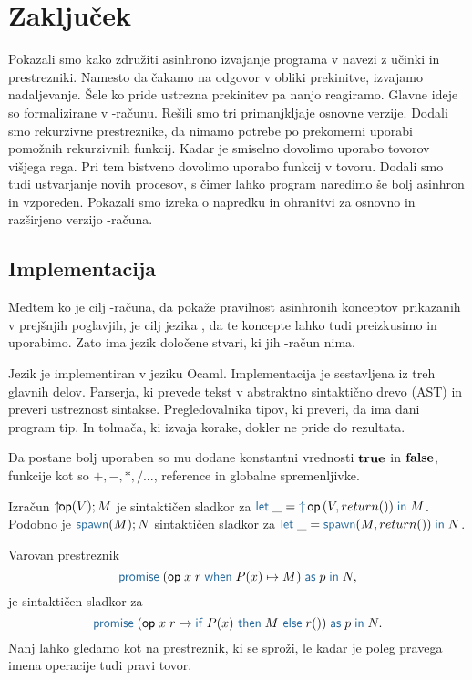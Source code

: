 \section{Zaključek}

Pokazali smo kako združiti asinhrono izvajanje programa v navezi z učinki in prestrezniki. Namesto da čakamo na odgovor v obliki prekinitve, izvajamo nadaljevanje. Šele ko pride ustrezna prekinitev pa nanjo reagiramo. Glavne ideje so formalizirane v \lae-računu. Rešili smo tri primanjkljaje osnovne verzije. Dodali smo rekurzivne prestreznike, da nimamo potrebe po prekomerni uporabi pomožnih rekurzivnih funkcij. Kadar je smiselno dovolimo uporabo tovorov višjega rega. Pri tem bistveno dovolimo uporabo funkcij v tovoru. Dodali smo tudi ustvarjanje novih procesov, s čimer lahko program naredimo še bolj asinhron in vzporeden. Pokazali smo izreka o napredku in ohranitvi za osnovno in razširjeno verzijo \lae-računa.

\subsection{Implementacija}\label{sec:implementacija}

Medtem ko je cilj \lae-računa, da pokaže pravilnost asinhronih konceptov prikazanih v prejšnjih poglavjih, je cilj jezika \aeff{}, da te koncepte lahko tudi preizkusimo in uporabimo. Zato ima jezik \aeff{} določene stvari, ki jih \lae-račun nima.

Jezik \aeff{} je implementiran v jeziku Ocaml. Implementacija je sestavljena iz treh glavnih delov.
Parserja, ki prevede tekst v abstraktno sintaktično drevo (AST) in preveri ustreznost sintakse.  
Pregledovalnika tipov, ki preveri, da ima dani program tip.
In tolmača, ki izvaja korake, dokler ne pride do rezultata.


Da \aeff{} postane bolj uporaben so mu dodane konstantni vrednosti $\mathbf{true}$ in $\mathbf{false}$, funkcije kot so $+, -, *, / ...$, reference in globalne spremenljivke.

Izračun $\uparrow\hspace{-1ex}\mathsf{op} (V);M$ je sintaktičen sladkor za $\tmlet{\_}{\tmopout{op}{V}{return ()}}{M}$.
Podobno je $\tmkw{spawn}(M);N$ sintaktičen sladkor za $\tmlet{\_}{\tmspawn{M}{return ()}}{N}$. 

Varovan prestreznik $$\tmwithrecgu{op}{x}{r}{P(x)}{M}{p}{N},$$ je sintaktičen sladkor za $$\tmwithrec{op}{x}{r}{\tmif{P(x)}{M}{r()}}{p}{N}.$$
Nanj lahko gledamo kot na prestreznik, ki se sproži, le kadar je poleg pravega imena operacije tudi pravi tovor.

